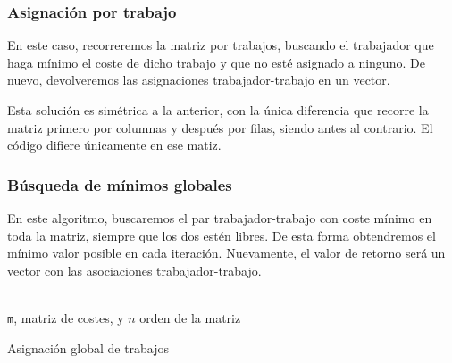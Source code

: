 \documentclass[a4paper, 11pt]{article} %
\begin{document}
	
		\subsubsection{Asignación por trabajo}
		En este caso, recorreremos la matriz por trabajos, buscando el trabajador que haga mínimo el coste de dicho trabajo y que no esté asignado a ninguno. De nuevo, devolveremos las asignaciones trabajador-trabajo en un vector. 
		
		Esta solución es simétrica a la anterior, con la única diferencia que recorre la matriz  primero por columnas 
		y después por filas, siendo antes al contrario. El código difiere únicamente en ese matiz. 
		
		\subsubsection{Búsqueda de mínimos globales}
		En este algoritmo, buscaremos el par trabajador-trabajo con coste mínimo en toda la matriz, siempre que los dos estén 
		libres. De esta forma obtendremos el mínimo valor posible en cada iteración. Nuevamente, el valor de retorno será un vector con las asociaciones trabajador-trabajo. 
		
		\begin{algorithm}[H]
			\begin{algorithmic}[1]
				\REQUIRE \ \\
					\texttt{m}, matriz de costes, y $n$ orden de la matriz\\
			           	  \ENDIF
			           	\ENDIF
			          \ENDFOR
			        \ENDIF
			      \ENDFOR
			    \ENDFOR  	
				        
			\end{algorithmic}
			   \caption{Asignación global de trabajos}
			   \label{Asignación Global}
		\end{algorithm}
		
\end{document}

